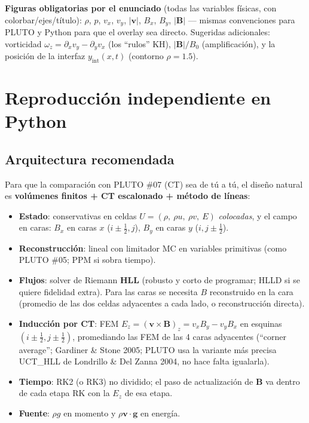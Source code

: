 \documentclass[11pt,a4paper]{article}
\newcommand{\B}{\mathbf{B}}
\newcommand{\vct}{\mathbf{v}}
\begin{document}
\textbf{Figuras obligatorias por el enunciado} (todas las variables físicas, con
colorbar/ejes/título): $\rho$, $p$, $v_x$, $v_y$, $|\vct|$, $B_x$, $B_y$, $|\B|$
— mismas convenciones para PLUTO y Python para que el overlay sea directo. Sugeridas
adicionales: vorticidad $\omega_z=\partial_x v_y-\partial_y v_x$ (los ``rulos'' KH),
$|\B|/B_0$ (amplificación), y la posición de la interfaz $y_\mathrm{int}(x,t)$ (contorno
$\rho=1.5$).

\section{Reproducción independiente en Python}
\label{sec:python}

\subsection{Arquitectura recomendada}

Para que la comparación con PLUTO \#07 (CT) sea de tú a tú, el diseño natural es
\textbf{volúmenes finitos + CT escalonado + método de líneas}:

\begin{itemize}[nosep]
  \item \textbf{Estado}: conservativas en celdas
  $U=(\rho,\ \rho u,\ \rho v,\ E)$ \emph{colocadas}, y el campo en caras:
  $B_x$ en caras $x$ ($i\pm\tfrac12,j$), $B_y$ en caras $y$ ($i,j\pm\tfrac12$).
  \item \textbf{Reconstrucción}: lineal con limitador MC en variables primitivas
  (como PLUTO \#05; PPM si sobra tiempo).
  \item \textbf{Flujos}: solver de Riemann \textbf{HLL} (robusto y corto de programar;
  HLLD si se quiere fidelidad extra). Para las caras se necesita $B$ reconstruido en la
  cara (promedio de las dos celdas adyacentes a cada lado, o reconstrucción directa).
  \item \textbf{Inducción por CT}: FEM $E_z=(\vct\times\B)_z=v_x B_y-v_y B_x$ en esquinas
  $(i\pm\tfrac12,j\pm\tfrac12)$, promediando las FEM de las 4 caras adyacentes
  (``corner average''; Gardiner \& Stone 2005; PLUTO usa la variante más precisa
  UCT\_HLL de Londrillo \& Del Zanna 2004, no hace falta igualarla).
  \item \textbf{Tiempo}: RK2 (o RK3) no dividido; el paso de actualización de $\B$ va
  dentro de cada etapa RK con la $E_z$ de esa etapa.
  \item \textbf{Fuente}: $\rho g$ en momento y $\rho\vct\cdot\mathbf{g}$ en energía.
\end{itemize}
\end{document}

